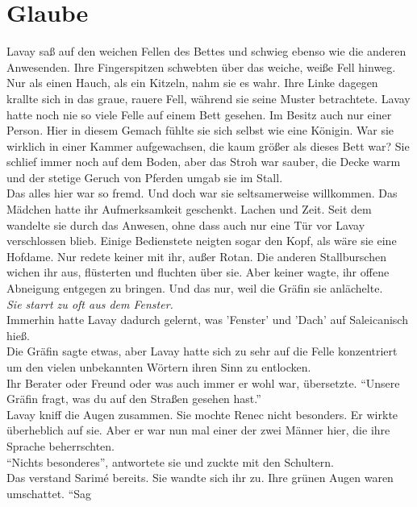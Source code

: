 \chapter{Glaube}

Lavay saß auf den weichen Fellen des Bettes und schwieg ebenso wie die anderen Anwesenden. Ihre 
Fingerspitzen schwebten über das weiche, weiße Fell hinweg. Nur als einen Hauch, als ein Kitzeln, 
nahm sie es wahr. Ihre Linke dagegen krallte sich in das graue, rauere Fell, während sie seine 
Muster betrachtete. Lavay hatte noch nie so viele Felle auf einem Bett gesehen. Im Besitz auch nur 
einer Person. Hier in diesem Gemach fühlte sie sich selbst wie eine Königin. War sie wirklich in 
einer Kammer aufgewachsen, die kaum größer als dieses Bett war? Sie schlief immer noch auf dem 
Boden, aber das Stroh war sauber, die Decke warm und der stetige Geruch von Pferden umgab sie im 
Stall.\\
Das alles hier war so fremd. Und doch war sie seltsamerweise willkommen. Das Mädchen hatte ihr 
Aufmerksamkeit geschenkt. Lachen und Zeit. Seit dem wandelte sie durch das Anwesen, ohne dass auch 
nur eine Tür vor Lavay verschlossen blieb. Einige Bedienstete neigten sogar den Kopf, als wäre sie eine Hofdame.
Nur redete keiner mit ihr, außer Rotan. Die anderen Stallburschen wichen ihr aus, flüsterten 
und fluchten über sie. Aber keiner wagte, ihr offene Abneigung entgegen zu bringen. Und das nur, 
weil die Gräfin sie anlächelte.\\                                          
\textit{Sie starrt zu oft aus dem Fenster.}\\
Immerhin hatte Lavay dadurch gelernt, was 'Fenster' und 'Dach' auf Saleicanisch hieß.\\
Die Gräfin sagte etwas, aber Lavay hatte sich zu sehr auf die Felle konzentriert um den vielen 
unbekannten Wörtern ihren Sinn zu entlocken.\\                                                   
Ihr Berater oder Freund oder was auch immer er wohl war, übersetzte. ``Unsere Gräfin fragt, was du 
auf den Straßen gesehen hast.''\\
Lavay kniff die Augen zusammen. Sie mochte Renec nicht besonders. Er wirkte überheblich auf sie. 
Aber er war nun mal einer der zwei Männer hier, die ihre Sprache beherrschten.\\
``Nichts besonderes'', antwortete sie und zuckte mit den Schultern.\\
Das verstand Sarimé bereits. Sie wandte sich ihr zu. Ihre grünen Augen waren umschattet. ``Sag 

